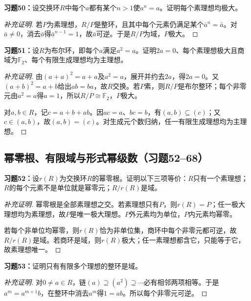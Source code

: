 \begin{problem}
\textbf{习题50：}设交换环$R$中每个$a$都有某个$n>1$使$a^n=a$。证明每个素理想均极大。
\end{problem}
\begin{proof}[补充证明]
若$P$为素理想，$R/P$是整环，且其中每个元素仍满足某个$\bar a^n=\bar a$。对$\bar a\ne0$，消去$\bar a$得$\bar a^{n-1}=1$，故$\bar a$可逆。于是$R/P$为域，$P$极大。
\end{proof}

\begin{problem}
\textbf{习题51：}设$R$为布尔环，即每个$a$满足$a^2=a$。证明$2a=0$、每个素理想极大且商域为$\mathbb F_2$、每个有限生成理想均为主理想。
\end{problem}
\begin{proof}[补充证明]
由$(a+a)^2=a+a$及$a^2=a$，展开并约去$2a$，得$2a=0$。又$(a+b)^2=a+b$给出$ab=ba$，故$R$交换。若$P$素，则$R/P$是布尔整环；每个非零元由$a^2=a$得$a=1$，所以$R/P\cong\mathbb F_2$，$P$极大。

对$a,b\in R$，记$c=a+b+ab$。因$ac=a$、$bc=b$，有$(a,b)\subseteq(c)$；又$c\in(a,b)$，故$(a,b)=(c)$。对生成元个数归纳，任一有限生成理想均为主理想。
\end{proof}

\subsection*{幂零根、有限域与形式幂级数（习题52--68）}

\begin{problem}
\textbf{习题52：}设$r(R)$为交换环$R$的幂零根。证明以下三项等价：$R$只有一个素理想；$R$的每个元素不是单位就是幂零元；$R/r(R)$是域。
\end{problem}
\begin{proof}[补充证明]
幂零根是全部素理想之交。若素理想只有$P$，则$r(R)=P$；任一极大理想均为素理想，故$P$是唯一极大理想。$P$外元素均为单位，$P$内元素均幂零。

若每个非单位均幂零，则$r(R)$恰为非单位集，商环中每个非零元都可逆，故$R/r(R)$是域。若商环是域，则$r(R)$极大；任一素理想都含它，只能等于它，故素理想唯一。
\end{proof}

\begin{problem}
\textbf{习题53：}证明只有有限多个理想的整环是域。
\end{problem}
\begin{proof}[补充证明]
对$0\ne a\in R$，链$(a)\supseteq(a^2)\supseteq\cdots$必有相邻两项相等。于是$a^m=a^{m+1}b$，在整环中消去$a^m$得$1=ab$。所以每个非零元可逆。
\end{proof}

